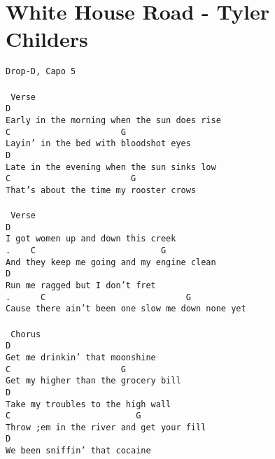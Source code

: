 \newpage
\section{White House Road - Tyler Childers}
\label{White House Road - Tyler Childers}
\texttt{Drop-D,\ Capo\ 5\\
\\
\lbrack\ Verse\rbrack\\
D\\
Early\ in\ the\ morning\ when\ the\ sun\ does\ rise\\
C\ \ \ \ \ \ \ \ \ \ \ \ \ \ \ \ \ \ \ \ \ \ G\\
Layin'\ in\ the\ bed\ with\ bloodshot\ eyes\\
D\\
Late\ in\ the\ evening\ when\ the\ sun\ sinks\ low\\
C\ \ \ \ \ \ \ \ \ \ \ \ \ \ \ \ \ \ \ \ \ \ \ \ G\\
That's\ about\ the\ time\ my\ rooster\ crows\\
\\
\lbrack\ Verse\rbrack\\
D\\
I\ got\ women\ up\ and\ down\ this\ creek\\
.\ \ \ \ C\ \ \ \ \ \ \ \ \ \ \ \ \ \ \ \ \ \ \ \ \ \ \ \ \ G\\
And\ they\ keep\ me\ going\ and\ my\ engine\ clean\\
D\\
Run\ me\ ragged\ but\ I\ don't\ fret\\
.\ \ \ \ \ \ C\ \ \ \ \ \ \ \ \ \ \ \ \ \ \ \ \ \ \ \ \ \ \ \ \ \ \ \ G\\
Cause\ there\ ain't\ been\ one\ slow\ me\ down\ none\ yet\\
\\
\lbrack\ Chorus\rbrack\\
D\\
Get\ me\ drinkin'\ that\ moonshine\\
C\ \ \ \ \ \ \ \ \ \ \ \ \ \ \ \ \ \ \ \ \ \ G\\
Get\ my\ higher\ than\ the\ grocery\ bill\\
D\\
Take\ my\ troubles\ to\ the\ high\ wall\\
C\ \ \ \ \ \ \ \ \ \ \ \ \ \ \ \ \ \ \ \ \ \ \ \ \ G\\
Throw\ ;em\ in\ the\ river\ and\ get\ your\ fill\\
D\\
We\ been\ sniffin'\ that\ cocaine\\
}
